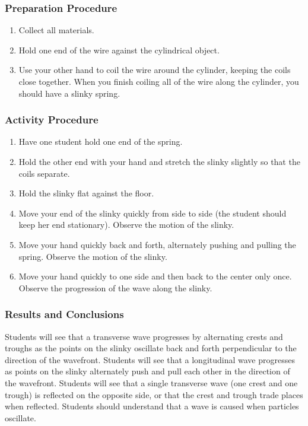 \subsubsection*{Preparation Procedure}
\begin{enumerate}
\item{Collect all materials.} 
\item{Hold one end of the wire against the cylindrical object.} 
\item{Use your other hand to coil the wire around the cylinder, keeping the coils close together. When you finish coiling all of the wire along the cylinder, you should have a slinky spring.} 
\end{enumerate}

\subsubsection*{Activity Procedure}
\begin{enumerate}
\item{Have one student hold one end of the spring.} 
\item{Hold the other end with your hand and stretch the slinky slightly so that the coils separate.} 
\item{Hold the slinky flat against the floor.} 
\item{Move your end of the slinky quickly from side to side (the student should keep her end stationary). Observe the motion of the slinky.} 
\item{Move your hand quickly back and forth, alternately pushing and pulling the spring. Observe the motion of the slinky.} 
\item{Move your hand quickly to one side and then back to the center only once. Observe the progression of the wave along the slinky.} 
\end{enumerate}

\subsubsection*{Results and Conclusions}
Students will see that a transverse wave progresses by alternating crests and troughs as the points on the slinky oscillate back and forth perpendicular to the direction of the wavefront.  
Students will see that a longitudinal wave progresses as points on the slinky alternately push and pull each other in the direction of the wavefront.  
Students will see that a single transverse wave (one crest and one trough) is reflected on the opposite side, or that the crest and trough trade places when reflected.  
Students should understand that a wave is caused when particles oscillate.  

